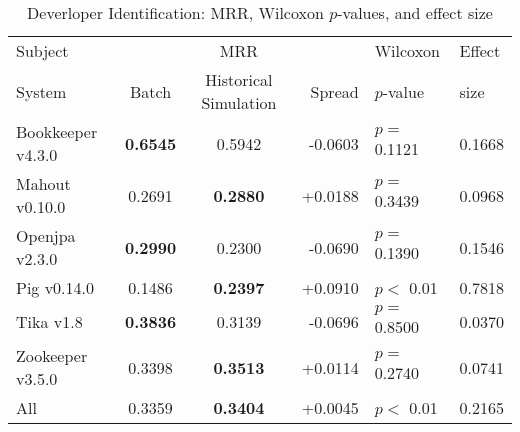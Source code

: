 \begin{table}[t]
\centering
\caption{Deverloper Identification: MRR, Wilcoxon $p$-values, and effect size}
\begin{tabular}{l|ccr|ll}
\toprule
Subject & & MRR & & Wilcoxon & Effect \\
System  &  Batch & Historical Simulation & Spread & $p$-value & size \\
\midrule
Bookkeeper v4.3.0 & {\bf 0.6545 } & 0.5942 & -0.0603 & $p = $ 0.1121 & 0.1668 \\
Mahout v0.10.0 & 0.2691 & {\bf 0.2880 } & +0.0188 & $p = $ 0.3439 & 0.0968 \\
Openjpa v2.3.0 & {\bf 0.2990 } & 0.2300 & -0.0690 & $p = $ 0.1390 & 0.1546 \\
Pig v0.14.0 & 0.1486 & {\bf 0.2397 } & +0.0910 & $p < $ 0.01 & 0.7818 \\
Tika v1.8 & {\bf 0.3836 } & 0.3139 & -0.0696 & $p = $ 0.8500 & 0.0370 \\
Zookeeper v3.5.0 & 0.3398 & {\bf 0.3513 } & +0.0114 & $p = $ 0.2740 & 0.0741 \\
\midrule
All & 0.3359 & {\bf 0.3404 } & +0.0045 & $p < $ 0.01 & 0.2165 \\
\bottomrule
\end{tabular}
\label{table:triage_rq2}
\end{table}
